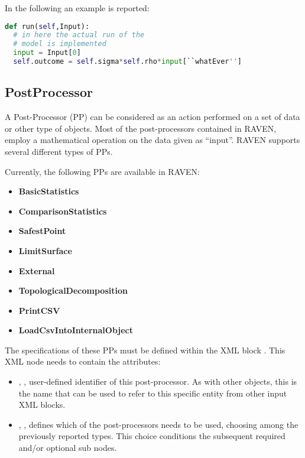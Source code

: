 In the following an example is reported:
\begin{lstlisting}[language=python]
def run(self,Input):
  # in here the actual run of the
  # model is implemented
  input = Input[0]
  self.outcome = self.sigma*self.rho*input[``whatEver'']
\end{lstlisting}

%


\subsection{PostProcessor}
\label{sec:models_postProcessor}
A Post-Processor (PP) can be considered as an action performed on a set of data
or other type of objects.
%
Most of the post-processors contained in RAVEN, employ a mathematical operation
on the data given as ``input''.
%
RAVEN supports several different types of PPs.

Currently, the following PPs are available in RAVEN:
\begin{itemize}
  \itemsep0em
  \item \textbf{BasicStatistics}
  \item \textbf{ComparisonStatistics}
  \item \textbf{SafestPoint}
  \item \textbf{LimitSurface}
  \item \textbf{External}
  \item \textbf{TopologicalDecomposition}
  \item \textbf{PrintCSV}
  \item \textbf{LoadCsvIntoInternalObject}
\end{itemize}

The specifications of these PPs must be defined within the XML block
.
%
This XML node needs to contain the attributes:
\vspace{-5mm}
\begin{itemize}
  \itemsep0em
  \item {}, , user-defined
  identifier of this post-processor.
  \nb As with other objects, this is the name that can be used to refer to this
  specific entity from other input XML blocks.
  \item {}, , defines which of
  the post-processors needs to be used, choosing among the previously reported 
  types.
  This choice conditions the subsequent required and/or optional
   sub nodes.
\end{itemize}
\vspace{-5mm}

